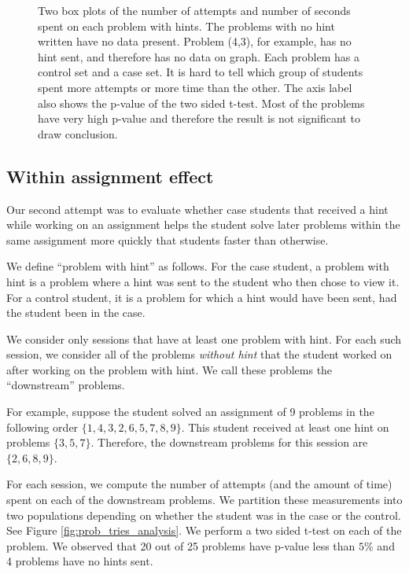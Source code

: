 \documentclass{llncs2e/llncs}
\begin{document}
\begin{figure}[ht]
\begin{tabular}{c c}
  \end{tabular}
  \caption{Two box plots of the number of attempts and number of seconds spent on each problem with hints. The problems with no hint written have no data present. Problem (4,3), for example, has no hint sent, and therefore has no data on graph. Each problem has a control set and a case set. It is hard to tell which group of students spent more attempts or more time than the other. The axis label also shows the p-value of the two sided t-test. Most of the problems have very high p-value and therefore the result is not significant to draw conclusion.}
   \label{fig:tries_analysis}
\end{figure}
\fi

\subsection{Within assignment effect}

Our second attempt was to evaluate whether case students that received a hint while
working on an assignment helps the student solve later problems within
the same assignment more quickly that students 
faster than otherwise.

We define ``problem with hint'' as follows. For the case student, a
problem with hint is a problem where a hint was sent to the student who then chose to view it. For a control student, it is a problem for which a hint would have been sent, had the student been in the case.

We consider only sessions that have at least one problem with
hint. For each such session, we consider all of the problems {\em
  without hint} that the student worked on after working on the
problem with hint. We call these problems the ``downstream'' problems.

For example, suppose the student solved an assignment of 9 problems in the following order $\{ 1, 4, 3, 2, 6, 5, 7, 8, 9\}$. This student received at least one hint on problems $\{3, 5, 7\}$. Therefore, the downstream problems for this session are $\{2, 6, 8, 9\}$.

For each session, we compute the number of attempts (and the amount of time) spent on each of the downstream problems. We partition these measurements into two populations depending on whether the student was in the case or the control. See Figure \ref{fig:prob_tries_analysis}. We perform a two sided t-test on each of the problem. We observed that 20 out of 25 problems have p-value less than $5\%$ and 4 problems have no hints sent.
\end{document}
